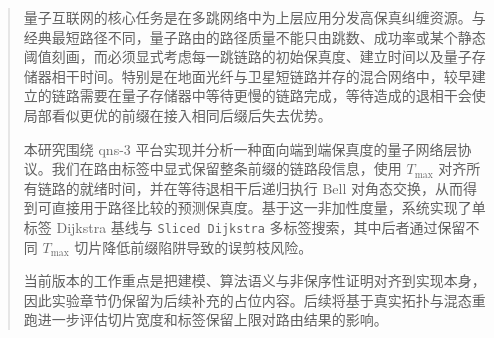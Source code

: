

\begin{abstract}
  量子互联网的核心任务是在多跳网络中为上层应用分发高保真纠缠资源。与经典最短路径不同，量子路由的路径质量不能只由跳数、成功率或某个静态阈值刻画，而必须显式考虑每一跳链路的初始保真度、建立时间以及量子存储器相干时间。特别是在地面光纤与卫星短链路并存的混合网络中，较早建立的链路需要在量子存储器中等待更慢的链路完成，等待造成的退相干会使局部看似更优的前缀在接入相同后缀后失去优势。

  本研究围绕 qns-3 平台实现并分析一种面向端到端保真度的量子网络层协议。我们在路由标签中显式保留整条前缀的链路段信息，使用 $T_{\max}$ 对齐所有链路的就绪时间，并在等待退相干后递归执行 Bell 对角态交换，从而得到可直接用于路径比较的预测保真度。基于这一非加性度量，系统实现了单标签 Dijkstra 基线与 \texttt{Sliced Dijkstra} 多标签搜索，其中后者通过保留不同 $T_{\max}$ 切片降低前缀陷阱导致的误剪枝风险。

  当前版本的工作重点是把建模、算法语义与非保序性证明对齐到实现本身，因此实验章节仍保留为后续补充的占位内容。后续将基于真实拓扑与混态重跑进一步评估切片宽度和标签保留上限对路由结果的影响。

\end{abstract}




